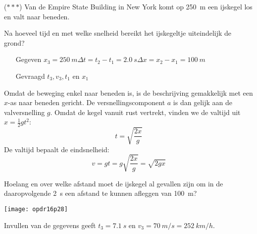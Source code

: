 \documentclass{ximera}
\begin{document}
\begin{exercise}
    ($\ast\ast\ast$) Van de Empire State Building in New York komt op \SI{250}{m} een ijskegel los en valt naar beneden.
    \begin{question} Na hoeveel tijd en met welke snelheid bereikt het ijskegeltje uiteindelijk de grond?                                                             
        \begin{oplossing}
            \begin{enumerate}
                \item[Gegeven]$x_3=\SI{250}{m}$\newline$\Delta t=t_2-t_1=\SI{2,0}{s}$\newline$\Delta x=x_2-x_1=\SI{100}{m}$
                \item[Gevraagd]$t_3,v_3,t_1$ en $x_1$
            \end{enumerate}
    
            Omdat de beweging enkel naar beneden is, is de beschrijving gemakkelijk met een $x$-as naar beneden gericht. De versnellingscomponent $a$ is dan gelijk aan de valversnelling $g$. Omdat de kegel vanuit rust vertrekt, vinden we de valtijd uit $x=\frac{1}{2}gt^2$:
            \begin{equation*}   
                t=\sqrt{\frac{2x}{g}}
            \end{equation*}
            De valtijd bepaalt de eindsnelheid:
            \begin{equation*}
                v=gt=g\sqrt{\frac{2x}{g}}=\sqrt{2gx}
            \end{equation*}
        
        \end{oplossing}
    \end{question}
    \begin{question} Hoelang en over welke afstand moet de ijskegel al gevallen zijn om in de daaropvolgende \SI{2}{s} een afstand te kunnen afleggen van \SI{100}{m}?
        \begin{oplossing}

            \begin{image}
                \texttt{[image: opdr16p28]}
            \end{image}
            Invullen van de gegevens geeft $t_3=\SI{7,1}{s}$ en $v_3=\SI{70}{m/s}=\SI{252}{km/h}$.
    

\end{oplossing}
\end{question}
\end{exercise}
\end{document}
